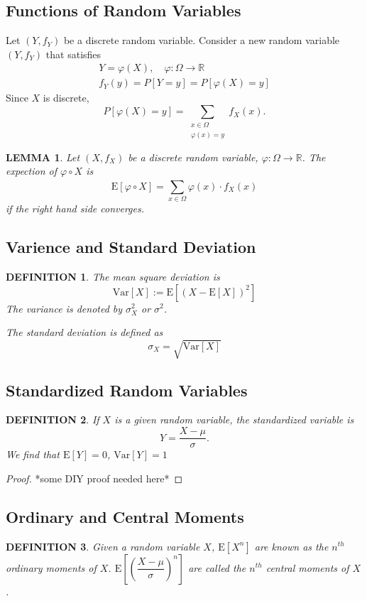 \documentclass[11pt,a4paper]{article}
\newtheorem*{lemma}{\bf LEMMA}
\newtheorem*{definition}{\bf DEFINITION}
\begin{document}
\subsection{Functions of Random Variables}
Let $(Y,f_Y)$ be a discrete random variable.
Consider a new random variable $(Y,f_Y)$ that satisfies
\begin{gather*}
    Y=\varphi(X),\quad \varphi:\varOmega\rightarrow\mathbb{R}\\
    f_Y(y)=P[Y=y]=P[\varphi(X)=y]
\end{gather*}
Since $X$ is discrete,
\[P[\varphi(X)=y]=\sum_{\substack{x\in\varOmega\\\varphi(x)=y}}f_X(x).\]


\begin{lemma}
    Let $(X,f_X)$ be a discrete random variable, $\varphi:\varOmega\rightarrow\mathbb{R}$.
    The expection of $\varphi\circ X$ is
    \[\mathrm{E}[\varphi\circ X]=\sum_{x\in\varOmega}^{}\varphi(x)\cdot f_X(x)\]
    if the right hand side converges.
\end{lemma}


\subsection{Varience and Standard Deviation}
\begin{definition}
    The mean square deviation is
    \[\mathrm{Var}[X]:=\mathrm{E}[(X-\mathrm{E}[X])^2]\]
    The variance is denoted by $\sigma_X^2$ or $\sigma^2$.

    The standard deviation is defined as\[\sigma_X=\sqrt{\mathrm{Var}[X]}\]
\end{definition}

\subsection{Standardized Random Variables}
\begin{definition}
    If $X$ is a given random variable, the standardized variable is
    \[Y=\frac{X-\mu}{\sigma}.\]
    We find that $\mathrm{E}[Y]=0$, $\mathrm{Var}[Y]=1$
\end{definition}
\begin{proof}
    *some DIY proof needed here*
\end{proof}

\subsection{Ordinary and Central Moments}
\begin{definition}
    Given a random variable $X$, $\mathrm{E}[X^n]$ are known as the $n^{th}$ ordinary moments of $X$.
    $\mathrm{E}\left[\left(\dfrac{X-\mu}{\sigma}\right)^n\right]$ are called the $n^{th}$ central moments of $X$.
\end{definition}
\end{document}

